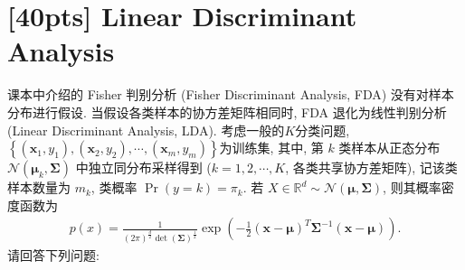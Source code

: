 \documentclass[a4paper,UTF8]{article}
\theoremstyle{definition}
\begin{document}
\newpage

\section{[40pts] Linear Discriminant Analysis}
课本中介绍的 Fisher 判别分析 (Fisher Discriminant Analysis, FDA) 没有对样本分布进行假设. 当假设各类样本的协方差矩阵相同时, FDA 退化为线性判别分析 (Linear Discriminant Analysis, LDA). 考虑一般的$K$分类问题, $\left\{(\bm{x}_1,y_1),(\bm{x}_2,y_2),\cdots,(\bm{x}_m,y_m)\right\}$为训练集, 其中, 第 $k$ 类样本从正态分布 $\mathcal{N}(\bm{\mu}_k,\bm{\Sigma})$ 中独立同分布采样得到 ($k=1,2,\cdots,K$, 各类共享协方差矩阵), 记该类样本数量为 $m_k$, 类概率 $\Pr\left(y=k\right)=\pi_k$. 若 $X\in \mathbb{R}^d \sim \mathcal{N}(\bm{\mu},\bm{\Sigma})$, 则其概率密度函数为
\begin{align}
	p(x)=\frac{1}{(2\pi)^{\frac{d}{2}}\det\left(\bm{\Sigma}\right)^\frac{1}{2}}\exp\left(-\frac{1}{2}(\bm{x}-\bm{\mu})^T\bm{\Sigma}^{-1}(\bm{x}-\bm{\mu})\right).
\end{align}
请回答下列问题:
\end{document}
